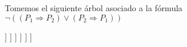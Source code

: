 \documentclass[a4paper,11pt]{article}
\theoremstyle{definition}
\theoremstyle{remark}
\begin{document}
Tomemos el siguiente árbol asociado a la fórmula $\neg((P_1 \Rightarrow P_2) \vee (P_2 \Rightarrow P_1))$

\begin{forest}
	[$\neg((P_1 \Rightarrow P_2) \vee (P_2 \Rightarrow P_1))$ 
		[$\neg(P_1 \Rightarrow P_2)$
			[$\neg(P_2 \Rightarrow P_1)$
				[$P_1$
					[$\neg P_2$
						[$P_2$
							[$\neg P_1$]
						]
					]
				]
			]
		]
	]
\end{forest}
\end{document}
